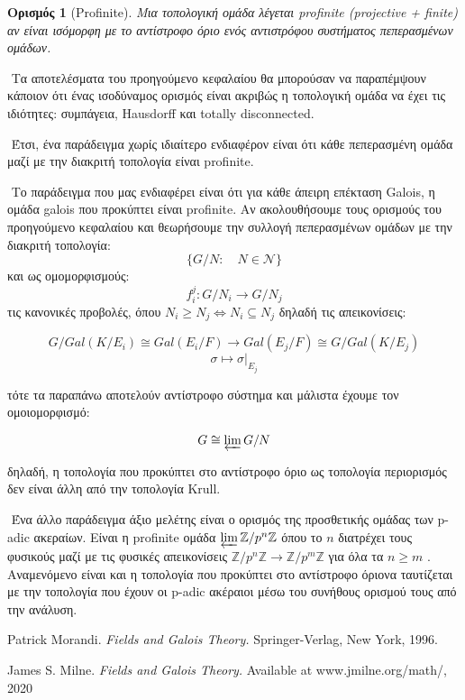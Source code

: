 \documentclass[oneside,a4paper]{article}
\newtheorem*{defn}{Ορισμός}
\newcommand {\tl}{\textlatin}
\begin{document}
\begin{defn}[\tl{Profinite}]Μια τοπολογική ομάδα λέγεται \tl{profinite (projective + finite)} αν είναι ισόμορφη με το αντίστροφο όριο ενός αντιστρόφου συστήματος πεπερασμένων ομάδων. 
\end{defn}

$ $\newline
\noindent Τα αποτελέσματα του προηγούμενο κεφαλαίου θα μπορούσαν να παραπέμψουν κάποιον ότι ένας ισοδύναμος ορισμός είναι ακριβώς η τοπολογική ομάδα να έχει τις ιδιότητες: συμπάγεια, \tl{Hausdorff} και totally disconnected.

$ $\newline
\noindent Έτσι, ένα παράδειγμα χωρίς ιδιαίτερο ενδιαφέρον είναι ότι κάθε πεπερασμένη ομάδα μαζί με την διακριτή τοπολογία είναι \tl{profinite}.

$ $\newline
\noindent Το παράδειγμα που μας ενδιαφέρει είναι ότι για κάθε άπειρη επέκταση Galois, η ομάδα galois που προκύπτει είναι profinite. Αν ακολουθήσουμε τους ορισμούς του προηγούμενο κεφαλαίου και θεωρήσουμε την συλλογή πεπερασμένων ομάδων με την διακριτή τοπολογία:
$$\{G/N: \quad N \in \mathcal{N}\}$$
και ως ομομορφισμούς:
$$f^j_i : G/N_i \longrightarrow G/N_j$$
τις κανονικές προβολές, όπου $N_i \geq N_j \iff N_i \subseteq N_j$
δηλαδή τις απεικονίσεις:

$$G/Gal(K/E_i) \cong Gal(E_i /F) \longrightarrow Gal(E_j /F) \cong G/Gal(K/E_j)$$
$$\sigma \longmapsto \sigma|_{E_j}$$

\noindent τότε τα παραπάνω αποτελούν αντίστροφο σύστημα και μάλιστα έχουμε τον ομοιομορφισμό:

$$G \cong \varprojlim G/N$$

\noindent δηλαδή, η τοπολογία που προκύπτει στο αντίστροφο όριο ως τοπολογία περιορισμός δεν είναι άλλη από την τοπολογία Krull.

$ $\newline
Ένα άλλο παράδειγμα άξιο μελέτης είναι ο ορισμός της προσθετικής ομάδας των p-adic ακεραίων. Είναι η profinite ομάδα $\varprojlim \mathbb{Z}/p^n \mathbb{Z}$ όπου το $n$ διατρέχει τους φυσικούς μαζί με τις φυσικές απεικονίσεις $\mathbb{Z}/p^n \mathbb{Z} \rightarrow \mathbb{Z}/p^m \mathbb{Z}$ για όλα τα $n\geq m$ . Αναμενόμενο είναι και η τοπολογία που προκύπτει στο αντίστροφο όριονα ταυτίζεται με την τοπολογία που έχουν οι p-adic ακέραιοι μέσω του συνήθους ορισμού τους από την ανάλυση.

\pagebreak

\begin{thebibliography}{9}
	\tl{Patrick Morandi.}
	\textit{\tl{Fields and Galois Theory.}}
	\tl{Springer-Verlag, New York, 1996.}

	\tl{James S. Milne.}
	\textit{\tl{Fields and Galois Theory.}}
	\tl{Available at www.jmilne.org/math/, 2020}
\end{thebibliography}

%
\end{document}

